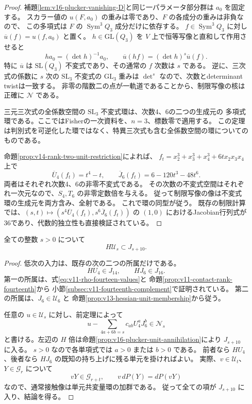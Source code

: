 \begin{proof}
補題\ref{lem:v16-plucker-vanishing-D}と同じ一パラメータ部分群は $a_0$ を固定する。
スカラー値の $u(F,a_0)$ の重みは零であり、$F$ の各成分の重みは非負なので、
この多項式は $F$ の $\operatorname{Sym}^3Q_3$ 成分だけに依存する。
$f\in\operatorname{Sym}^3Q_3$ に対し $\overline u(f)=u(f,a_0)$ と置く。
$h\in\mathrm{GL}(Q_3)$ を $V$ 上で恒等写像と直和して作用させると
\[
 h a_0=(\det h)^{-1}a_0,
 \qquad \overline u(hf)=(\det h)^s\overline u(f).
\]
特に $\overline u$ は $\mathrm{SL}(Q_3)$ 不変式であり、その通常の $f$ 次数は $s$ である。
逆に、三次式の係数に $s$ 次の $\mathrm{SL}_3$ 不変式の $\mathrm{GL}_3$ 重みは
$\det^s$ なので、次数とdeterminant twistは一致する。
非零の階数二の点が一軌道であることから、制限写像の核は正確に $\mathcal N$ である。

三元三次式の全係数空間の $\mathrm{SL}_3$ 不変式環は、次数4、6の二つの生成元の
多項式環である。ここではFisherの一次資料\cite[\S3.3,\S4,
Lemma~4.3, Theorem~4.4(i)]{Fisher2008}を、$n=3$、標数零で適用する。
この定理は判別式を可逆化した環ではなく、特異三次式も含む全係数空間の環についてのものである。

命題\ref{prop:v14-rank-two-unit-restriction}によれば、
$f_t=x_2^3+x_3^3+x_4^3+6t x_2x_3x_4$ 上で
\[
 \overline U_4(f_t)=t^4-t,\qquad
 \overline J_6(f_t)=6-120t^3-48t^6.
\]
両者はそれぞれ次数4、6の非零不変式である。
その次数の不変式空間はそれぞれ一次元なので、$S_4,T_6$ の非零定数倍を与える。
従って制限写像の像は不変式環の生成元を両方含み、全射である。
これで環の同型が従う。
既存の制限計算では、$(s,t)\mapsto(s^4\overline U_4(f_t),s^6\overline J_6(f_t))$
の $(1,0)$ におけるJacobian行列式が36であり、代数的独立性も直接検証されている。
\end{proof}

\begin{theorem}[全ての正次数単元倍の消去]
\label{thm:v16-positive-unit-hessian-annihilation}
全ての整数 $s>0$ について
\begin{equation}\label{eq:v16-all-positive-unit-hessian}
 H\mathcal U_s\subset J_{s+10}.
\end{equation}
\end{theorem}

\begin{proof}
低次の入力は、既存の次の二つの所属だけである。
\[
 HU_4\in J_{14},\qquad HJ_6\in J_{16}.
\]
第一の所属は、式\eqref{eq:v11-rho-fourteen-values}と
命題\ref{prop:v11-contact-rank-fourteenth}から
小節\ref{subsec:v11-fourteenth-complement}で証明されている。
第二の所属は、$J_6\in\mathcal U_6$ と
命題\ref{prop:v13-hessian-unit-membership}から従う。

任意の $u\in\mathcal U_s$ に対し、前定理によって
\[
 u-\sum_{4a+6b=s}c_{ab}U_4^aJ_6^b\in\mathcal N_s
\]
と書ける。左辺の $H$ 倍は命題\ref{prop:v16-plucker-unit-annihilation}により
$J_{s+10}$ に入る。
$s>0$ なので各単項式では $a>0$ または $b>0$ である。
前者なら $HU_4$、後者なら $HJ_6$ の既知の持ち上げに残る単元を掛ければよい。
実際、$v\in\mathcal U_t$、$Y\in\mathcal G_r$ について
\[
 vY\in\mathcal G_{r+t},\qquad v\,dP(Y)=dP(vY)
\]
なので、通常接触像は単元共変量環の加群である。
従って全ての項が $J_{s+10}$ に入り、結論を得る。
\end{proof}

